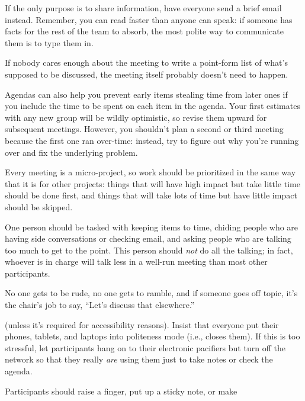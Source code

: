 \begin{description}
\tightlist
\item[Decide if there actually needs to be a meeting.]
If the only purpose is to share information, have everyone send a
brief email instead. Remember, you can read faster than anyone can
speak: if someone has facts for the rest of the team to absorb, the
most polite way to communicate them is to type them in.
\item[Write an agenda.]
If nobody cares enough about the meeting to write a point-form list
of what's supposed to be discussed, the meeting itself probably
doesn't need to happen.
\item[Include timings in the agenda.]
Agendas can also help you prevent early items stealing time from
later ones if you include the time to be spent on each item in the
agenda. Your first estimates with any new group will be wildly
optimistic, so revise them upward for subsequent meetings. However,
you shouldn't plan a second or third meeting because the first one
ran over-time: instead, try to figure out why you're running over
and fix the underlying problem.
\item[Prioritize.]
Every meeting is a micro-project, so work should be prioritized in
the same way that it is for other projects: things that will have
high impact but take little time should be done first, and things
that will take lots of time but have little impact should be
skipped.
\item[Make one person responsible for keeping things moving.]
One person should be tasked with keeping items to time, chiding
people who are having side conversations or checking email, and
asking people who are talking too much to get to the point. This
person should \emph{not} do all the talking; in fact, whoever is in
charge will talk less in a well-run meeting than most other
participants.
\item[Require politeness.]
No one gets to be rude, no one gets to ramble, and if someone goes
off topic, it's the chair's job to say, ``Let's discuss that
elsewhere.''
\item[No technology]
(unless it's required for accessibility reasons). Insist that
everyone put their phones, tablets, and laptops into politeness mode
(i.e., closes them). If this is too stressful, let participants hang
on to their electronic pacifiers but turn off the network so that
they really \emph{are} using them just to take notes or check the agenda.
\item[No interruptions.]
Participants should raise a finger, put up a sticky note, or make

\end{description}
